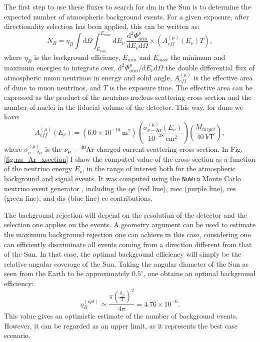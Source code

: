 The first step to use these fluxes to search for \gls{dm} in the Sun is to determine the expected number of atmospheric background events. For a given exposure, after directionality selection has been applied, this can be written as:
\begin{equation}\label{4.1}
	N_{B} = \eta_{B} \int \mathrm{d}\Omega \int_{E_{min}}^{E_{max}} \mathrm{d}E_{\nu} \ \frac{\mathrm{d}^{2}\Phi_{atm}^{\mu}}{\mathrm{d}E_{\nu} \mathrm{d}\Omega} \times \left(A_{eff}^{(\mu)}(E_{\nu}) T\right),
\end{equation}
where $\eta_{B}$ is the background efficiency, $E_{min}$ and $E_{max}$ the minimum and maximum energies to integrate over, $\mathrm{d}^{2}\Phi_{atm}^{\mu} / \mathrm{d}E_{\nu} \mathrm{d}\Omega$ the double differential flux of atmospheric muon neutrinos in energy and solid angle, $A_{eff}^{(\mu)}$ is the effective area of \gls{dune} to muon neutrinos, and $T$ is the exposure time. The effective area can be expressed as the product of the neutrino-nucleus scattering cross section and the number of nuclei in the fiducial volume of the detector. This way, for \gls{dune} we have:
\begin{equation}\label{4.2}
	A_{eff}^{(\mu)}(E_{\nu}) = (6.0 \times 10^{-10} \ \mathrm{m}^{2}) \left(\frac{\sigma_{\nu - \mathrm{Ar}}^{(\mu)}(E_{\nu})}{10^{-38} \ \mathrm{cm}^{2}}\right) \left(\frac{M_{target}}{40 \ \mathrm{kT}}\right),
\end{equation}
where $\sigma_{\nu - \mathrm{Ar}}^{(\mu)}$ is the $\nu_{\mu}-\ce{^{40}Ar}$ charged-current scattering cross section. In Fig. \ref{fig:nu_Ar_xsection} I show the computed value of the cross section as a function of the neutrino energy $E_{\nu}$, in the range of interest both for the atmospheric background and signal events. It was computed using the \texttt{NuWro} Monte Carlo neutrino event generator \cite{Golan2012}, including the \gls{qe} (red line), \gls{mec} (purple line), \gls{res} (green line), and \gls{dis} (blue line) \gls{cc} contributions.

The background rejection will depend on the resolution of the detector and the selection one applies on the events. A geometry argument can be used to estimate the maximum background rejection one can achieve in this case, considering one can efficiently discriminate all events coming from a direction different from that of the Sun. In that case, the optimal background efficiency will simply be the relative angular coverage of the Sun. Taking the angular diameter of the Sun as seen from the Earth to be approximately $0.5^{\circ}$, one obtains an optimal background efficiency:
\begin{equation}\label{4.3}
	\eta_{B}^{(opt)} \simeq \frac{\pi \left(\frac{\delta_{\odot}}{2}\right)^{2}}{4\pi} = 4.76 \times 10^{-6}.
\end{equation}
This value gives an optimistic estimate of the number of background events. However, it can be regarded as an upper limit, as it represents the best case scenario.


